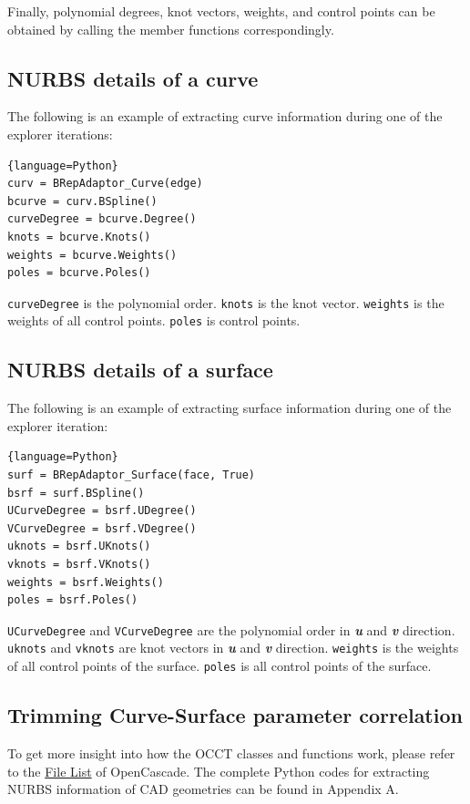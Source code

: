 \documentclass[12pt, a4paper]{report}
\begin{document}
Finally, polynomial degrees, knot vectors, weights, and control points can be obtained by calling the member functions correspondingly.
\subsection{NURBS details of a curve}
The following is an example of extracting curve information during one of the explorer iterations: 
\vspace{12pt}
\begin{lstlisting}{language=Python}
curv = BRepAdaptor_Curve(edge)
bcurve = curv.BSpline()
curveDegree = bcurve.Degree()
knots = bcurve.Knots()
weights = bcurve.Weights()
poles = bcurve.Poles()
\end{lstlisting}
\texttt{curveDegree} is the polynomial order. \texttt{knots} is the knot vector. \texttt{weights} is the weights of all control points. \texttt{poles} is control points.
\subsection{NURBS details of a surface}
The following is an example of extracting surface information during one of the explorer iteration:
\vspace{12pt}
\begin{lstlisting}{language=Python}
surf = BRepAdaptor_Surface(face, True)
bsrf = surf.BSpline()
UCurveDegree = bsrf.UDegree()
VCurveDegree = bsrf.VDegree()
uknots = bsrf.UKnots()
vknots = bsrf.VKnots()
weights = bsrf.Weights()
poles = bsrf.Poles()
\end{lstlisting}
\texttt{UCurveDegree} and \texttt{VCurveDegree} are the polynomial order in \textbf{\textit{u}} and \textbf{\textit{v}}  direction. \texttt{uknots} and \texttt{vknots} are knot vectors in \textbf{\textit{u}} and \textbf{\textit{v}} direction. \texttt{weights} is the weights of all control points of the surface. \texttt{poles} is all control points of the surface.

\subsection{Trimming Curve-Surface parameter correlation}\label{sec: trim_corr}




To get more insight into how the OCCT classes and functions work, please refer to the \href{https://dev.opencascade.org/doc/occt-7.6.0/refman/html/files.html}{File List} of OpenCascade. The complete Python codes for extracting NURBS information of CAD geometries can be found in Appendix A. 
\end{document}
